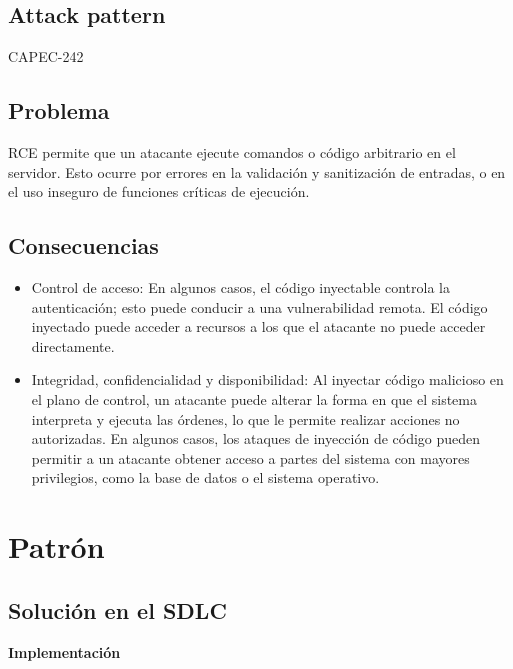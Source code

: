 \subsection{Attack pattern}
CAPEC-242
\subsection{Problema}
RCE permite que un atacante ejecute comandos o código arbitrario en el servidor. Esto ocurre por errores en la validación y sanitización de entradas, o en el uso inseguro de funciones críticas de ejecución.
\subsection{Consecuencias}
\begin{itemize}
    \item Control de acceso: En algunos casos, el código inyectable controla la autenticación; esto puede conducir a una vulnerabilidad remota. El código inyectado puede acceder a recursos a los que el atacante no puede acceder directamente.
    \item Integridad, confidencialidad y disponibilidad: Al inyectar código malicioso en el plano de control, un atacante puede alterar la forma en que el sistema interpreta y ejecuta las órdenes, lo que le permite realizar acciones no autorizadas. En algunos casos, los ataques de inyección de código pueden permitir a un atacante obtener acceso a partes del sistema con mayores privilegios, como la base de datos o el sistema operativo. 
\end{itemize}

\section{Patrón}

\subsection{Solución en el SDLC}

\textbf{Implementación} \\

